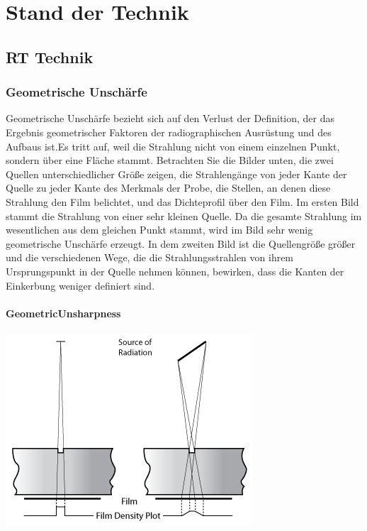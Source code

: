 \chapter{Stand der Technik}
\label{cha:stand_der_technik}

\section{RT Technik}

\subsection{Geometrische Unschärfe }
\label{sec:ndt}

Geometrische Unschärfe bezieht sich auf den Verlust der Definition, der das Ergebnis geometrischer Faktoren der radiographischen Ausrüstung und des Aufbaus ist.Es tritt auf, weil die Strahlung nicht von einem einzelnen Punkt, sondern über eine Fläche stammt.
Betrachten Sie die Bilder unten, die zwei Quellen unterschiedlicher Größe zeigen, die Strahlengänge von jeder Kante der Quelle zu jeder Kante des Merkmals der Probe, die Stellen, an denen diese Strahlung den Film belichtet, und das Dichteprofil über den Film. Im ersten Bild stammt die Strahlung von einer sehr kleinen Quelle. Da die gesamte Strahlung im wesentlichen aus dem gleichen Punkt stammt, wird im Bild sehr wenig geometrische Unschärfe erzeugt. In dem zweiten Bild ist die Quellengröße größer und die verschiedenen Wege, die die Strahlungsstrahlen von ihrem Ursprungspunkt in der Quelle nehmen können, bewirken, dass die Kanten der Einkerbung weniger definiert sind.\\
\subsubsection{GeometricUnsharpness}
\includegraphics[scale=0.5]{img/GeometricUnsharpness.png}\\

